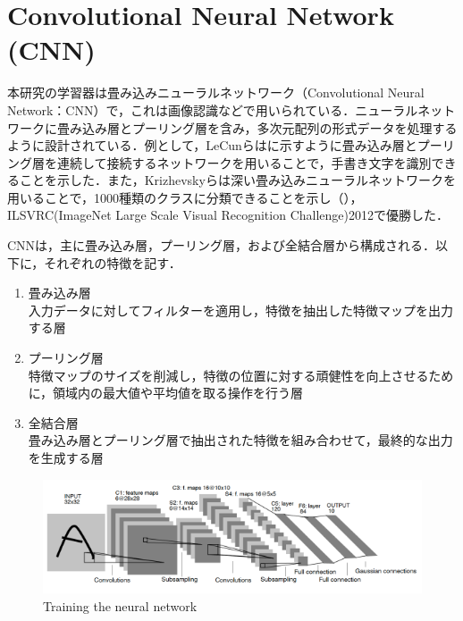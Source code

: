 
\section{Convolutional Neural Network (CNN)}

  本研究の学習器は畳み込みニューラルネットワーク（Convolutional Neural Network：CNN）で，これは画像認識などで用いられている\cite{yann1}\cite{alex}．ニューラルネットワークに畳み込み層とプーリング層を含み，多次元配列の形式データを処理するように設計されている．例として，LeCunら\cite{yann1}はに示すように畳み込み層とプーリング層を連続して接続するネットワークを用いることで，手書き文字を識別できることを示した．また，Krizhevskyら\cite{alex}は深い畳み込みニューラルネットワークを用いることで，1000種類のクラスに分類できることを示し（），ILSVRC(ImageNet Large Scale Visual Recognition Challenge)2012で優勝した．

  CNNは，主に畳み込み層，プーリング層，および全結合層から構成される．以下に，それぞれの特徴を記す．

  \begin{enumerate}
    \item 畳み込み層\\
    入力データに対してフィルターを適用し，特徴を抽出した特徴マップを出力する層
    \item プーリング層\\
    特徴マップのサイズを削減し，特徴の位置に対する頑健性を向上させるために，領域内の最大値や平均値を取る操作を行う層
    \item 全結合層\\
    畳み込み層とプーリング層で抽出された特徴を組み合わせて，最終的な出力を生成する層
  \end{enumerate}

  \begin{figure}[h]
    \centering
    \includegraphics[keepaspectratio, scale=0.50] {images/yann_CNN.png}
    \caption{Training the neural network \cite{yann1}}
    \label{Fig:yann_CNN}
  \end{figure}

